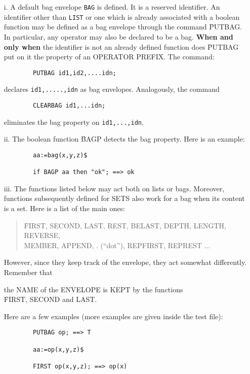 \begin{itemize}
\item[i.] A default bag envelope \verb+BAG+ is defined.
It is a reserved identifier.
An identifier other than \verb+LIST+ or one which is already associated
with a boolean function may be defined as a bag envelope through the
command \f{PUTBAG}. In particular, any operator may also be declared
to be a bag. {\bf When and only when} the identifier is not an already defined
function does \f{PUTBAG} put on it the property of an OPERATOR PREFIX.
The command:
\begin{verbatim}
        PUTBAG id1,id2,....idn;
\end{verbatim}
declares \verb+id1,.....,idn+ as bag envelopes.
Analogously, the command
\begin{verbatim}
        CLEARBAG id1,...idn;
\end{verbatim}
eliminates the bag property on \verb+id1,...,idn+.
\item[ii.] The boolean function \f{BAGP} detects the bag property.
Here is an example:
\begin{verbatim}
        aa:=bag(x,y,z)$

        if BAGP aa then "ok"; ==> ok
\end{verbatim}
\item[iii.] The functions listed below may act both on lists or bags.
Moreover, functions subsequently  defined for  SETS also work for a bag
when its content is a set.
Here is a list of the main ones:

\begin{quote}
\f{FIRST, SECOND, LAST, REST, BELAST, DEPTH, LENGTH, REVERSE,\\
MEMBER, APPEND, . (``dot''), REPFIRST, REPREST} $\ldots$
\end{quote}

However, since they keep track of the envelope, they act
somewhat differently. Remember that   
\vspace{5pt}
\begin{center}
the NAME of the ENVELOPE is KEPT by the functions \\[3pt]
\f{FIRST, SECOND and LAST}.
\end{center}
Here are a few examples (more examples are
given inside the test file):
\begin{verbatim}
        PUTBAG op; ==> T

        aa:=op(x,y,z)$

        FIRST op(x,y,z); ==> op(x)


\end{verbatim}
\end{itemize}
